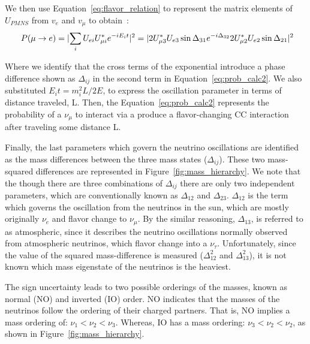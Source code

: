 We then use Equation~\ref{eq:flavor_relation} to represent the matrix elements of $U_{PMNS}$ from $v_{e}$ and $v_{\mu}$  to obtain~\citep{Nunokawa_2008}:
\begin{equation}~\label{eq:prob_calc2}
  P(\mu \rightarrow e)
  = \lvert \sum_{i} U_{e i} U^{*}_{\mu i} e^{-i E_{i}t} \rvert^{2} \\
  = \lvert 2U^{*}_{\mu 3}U_{e3}\sin \Delta_{31}e^{-i\Delta_{32}} 2U^{*}_{\mu 2}U_{e2}\sin \Delta_{21} \rvert^{2}
\end{equation}

Where we identify that the cross terms of the exponential introduce a phase difference shown as $\Delta_{ij}$ in the second term in Equation~\ref{eq:prob_calc2}.
We also substituted $E_{i}t = m^{2}_{i}L/2E$, to express the oscillation parameter in terms of distance traveled, L.
Then, the Equation~\ref{eq:prob_calc2} represents the probability of a $\nu_{\mu}$ to interact via a produce a flavor-changing CC interaction after traveling some distance L.

Finally, the last parameters which govern the neutrino oscillations are identified as the mass differences between the three mass states ($\Delta_{ij}$).
These two mass-squared differences are represented in Figure~\ref{fig:mass_hierarchy}.
We note that the though there are three combinations of $\Delta_{ij}$ there are only two independent parameters, which are conventionally known as $\Delta_{12}$ and $\Delta_{23}$.
$\Delta_{12}$ is the term which governs the oscillation from the neutrinos in the sun, which are mostly originally $\nu_{e}$ and flavor change to $\nu_{\mu}$.
By the similar reasoning, $\Delta_{13}$, is referred to as atmospheric, since it describes the neutrino oscillations normally observed from atmospheric neutrinos, which flavor change into a $\nu_{\tau}$.
Unfortunately, since the value of the squared mass-difference is measured ($\Delta_{12}^{2}$ and $\Delta_{13}^{2}$), it is not known which mass eigenstate of the neutrinos is the heaviest.

The sign uncertainty leads to two possible orderings of the masses, known as normal (NO) and inverted (IO) order.
NO indicates that the masses of the neutrinos follow the ordering of their charged partners.
That is, NO implies a mass ordering of: $\nu_{1} < \nu_{2} < \nu_{3}$.
Whereas, IO has a mass ordering: $\nu_{3} < \nu_{2} < \nu_{2}$, as shown in Figure~\ref{fig:mass_hierarchy}.

